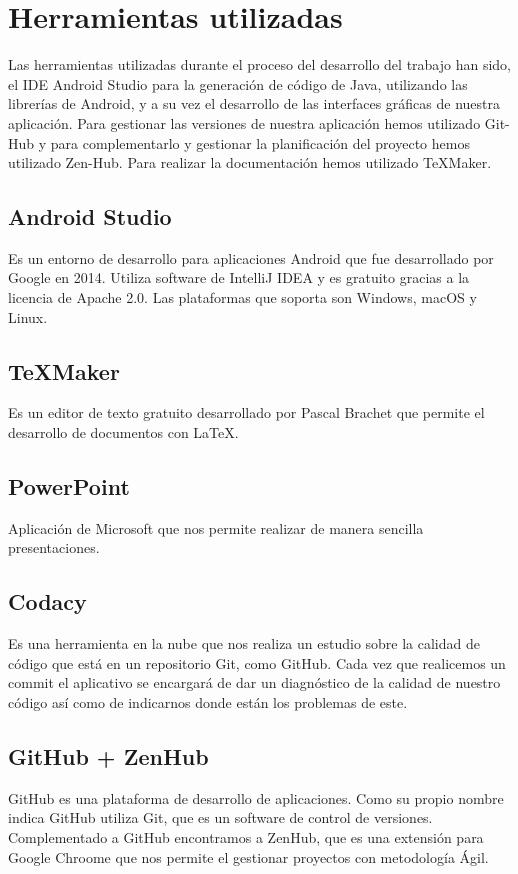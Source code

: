 
\section{Herramientas utilizadas}
Las herramientas utilizadas durante el proceso del desarrollo del trabajo han sido, el IDE Android Studio para la generación de código de Java, utilizando las librerías de Android, y a su vez el desarrollo de las interfaces gráficas de nuestra aplicación.
Para gestionar las versiones de nuestra aplicación hemos utilizado Git-Hub y para complementarlo y gestionar la planificación del proyecto hemos utilizado Zen-Hub.
Para realizar la documentación hemos utilizado \TeX{}Maker.

\subsection{Android Studio}

Es un entorno de desarrollo para aplicaciones Android que fue desarrollado por Google en 2014. Utiliza software de IntelliJ IDEA y es gratuito gracias a la licencia de Apache 2.0.
Las plataformas que soporta son Windows, macOS y Linux.

\subsection{\TeX{}Maker}

Es un editor de texto gratuito desarrollado por Pascal Brachet que permite el desarrollo de documentos con La\TeX{}.

\subsection{PowerPoint}

Aplicación de Microsoft que nos permite realizar de manera sencilla presentaciones.

\subsection{Codacy}

Es una herramienta en la nube que nos realiza un estudio sobre la calidad de código que está en un repositorio Git, como GitHub. Cada vez que realicemos un commit el aplicativo se encargará de dar un diagnóstico de la calidad de nuestro código así como de indicarnos donde están los problemas de este.

\subsection{GitHub + ZenHub}
GitHub es una plataforma de desarrollo de aplicaciones. Como su propio nombre indica GitHub utiliza Git, que es un software de control de versiones.
Complementado a GitHub encontramos a ZenHub, que es una extensión para Google Chroome que nos permite el gestionar proyectos con metodología Ágil.

